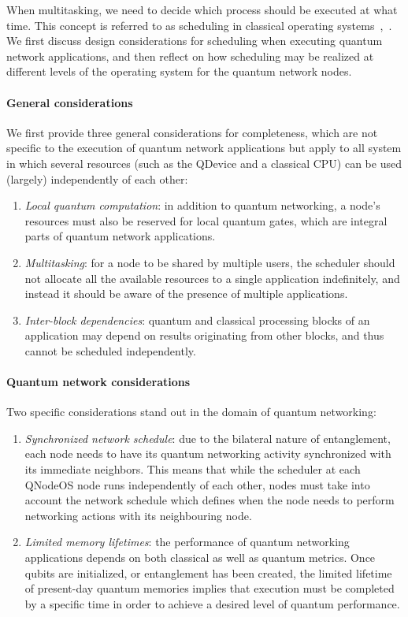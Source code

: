 When multitasking, we need to decide which process should be executed at what time. This concept is referred to as  scheduling in classical operating systems~\cite[Section 2.4]{tanenbaum_operating_2005},~\cite[Section 3.2]{silberschatz_book_2014}. We first discuss design considerations for scheduling when executing quantum network applications, and then reflect on how scheduling may be realized at different levels of the operating system for the quantum network nodes. 

\paragraph{General considerations}

We first provide three general considerations for completeness, which are not specific to the execution of quantum network applications but apply to all system in which several resources (such as the \ac{QDevice} and a classical \ac{CPU}) can be used (largely) independently of each other:
%
\begin{enumerate}
\item \emph{Local quantum computation}: in addition to quantum networking, a node's resources must also be reserved for local quantum gates, which are integral parts of quantum network applications.
\item \emph{Multitasking}: for a node to be shared by multiple users, the scheduler should not allocate all the available resources to a single application indefinitely, and instead it should be aware of the presence of multiple applications.
\item \emph{Inter-block dependencies}: quantum and classical processing blocks of an application may depend on results originating from other blocks, and thus cannot be scheduled independently.
\end{enumerate}

\paragraph{Quantum network considerations}

Two specific considerations stand out in the domain of quantum networking:
%
\begin{enumerate}
\item \emph{Synchronized network schedule}: due to the bilateral nature of entanglement, each node needs to have its quantum networking activity synchronized with its immediate neighbors. This means that while the scheduler at each \ac{QNodeOS} node runs independently of each other, nodes must take into account the network schedule which defines when the node needs to perform networking actions with its neighbouring node. 
\item \emph{Limited memory lifetimes}: the performance of quantum networking applications depends on both classical as well as quantum metrics. Once qubits are initialized, or entanglement has been created, the limited lifetime of present-day quantum memories implies that execution must be completed by a specific time in order to achieve a desired level of quantum performance. 
\end{enumerate}

